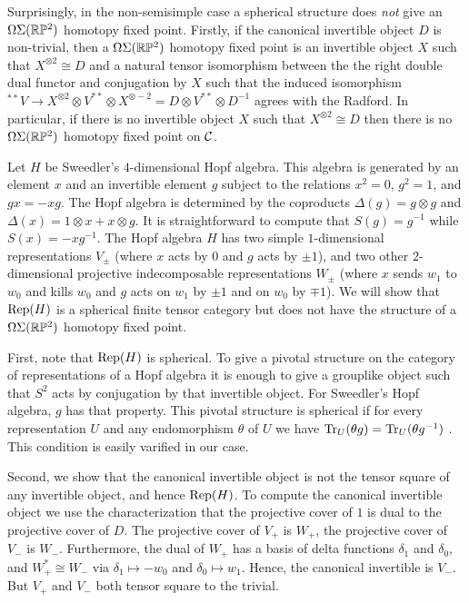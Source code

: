 \documentclass{amsart}
\begin{document}
Surprisingly, in the non-semisimple case a spherical structure does \emph{not} give an $\Omega \Sigma (\mathbb R \mathbb P^2)$ homotopy fixed point.  Firstly, if the canonical invertible object $D$ is non-trivial, then a $\Omega \Sigma (\mathbb R \mathbb P^2)$ homotopy fixed point is an invertible object $X$ such that $X^{\otimes 2} \cong D$ and a natural tensor isomorphism between the the right double dual functor and conjugation by $X$ such that the induced isomorphism ${}^{**}V \rightarrow X^{\otimes 2} \otimes V^{**} \otimes X^{\otimes -2} = D \otimes V^{**} \otimes D^{-1}$ agrees with the Radford.  In particular, if there is no invertible object $X$ such that $X^{\otimes 2} \cong D$ then there is no $\Omega \Sigma (\mathbb R \mathbb P^2)$ homotopy fixed point on $\mathcal C$.

\begin{example}
Let $H$ be Sweedler's $4$-dimensional Hopf algebra.  This algebra is generated by an element $x$ and an invertible element $g$ subject to the relations $x^2 = 0$, $g^2 = 1$, and $gx = -xg$.  The Hopf algebra is determined by the coproducts $\Delta(g) = g \otimes g$ and $\Delta(x) = 1 \otimes x + x \otimes g$.  It is straightforward to compute that $S(g) = g^{-1}$ while $S(x) = - x g^{-1}$.  The Hopf algebra $H$ has two simple $1$-dimensional representations $V_{\pm}$ (where $x$ acts by $0$ and $g$ acts by $\pm 1$), and two other $2$-dimensional projective indecomposable representations $W_\pm$ (where $x$ sends $w_1$ to $w_0$ and kills $w_0$ and $g$ acts on $w_1$ by $\pm 1$ and on $w_0$ by $\mp 1$).  We will show that $\mathrm{Rep}(H)$ is a spherical finite tensor category but does not have the structure of a $\Omega \Sigma (\mathbb R \mathbb P^2)$ homotopy fixed point.

First, note that $\mathrm{Rep}(H)$ is spherical.  To give a pivotal structure on the category of representations of a Hopf algebra it is enough to give a grouplike object such that $S^2$ acts by conjugation by that invertible object.  For Sweedler's Hopf algebra, $g$ has that property.  This pivotal structure is spherical if for every representation $U$ and any endomorphism $\theta$ of $U$ we have $\mathrm{Tr}_U(\theta g) = \mathrm{Tr}_U(\theta g^{-1})$ \cite{???}.  This condition is easily varified in our case.

Second, we show that the canonical invertible object is not the tensor square of any invertible object, and hence $\mathrm{Rep}(H)$.  To compute the canonical invertible object we use the characterization that the projective cover of $1$ is dual to the projective cover of $D$.  The projective cover of $V_+$ is $W_+$, the projective cover of $V_-$ is $W_-$.  Furthermore, the dual of $W_+$ has a basis of delta functions $\delta_1$ and $\delta_0$, and $W_+^* \cong W_-$ via $\delta_1 \mapsto -w_0$ and $\delta_0 \mapsto w_1$.  Hence, the canonical invertible is $V_-$.  But $V_+$ and $V_-$ both tensor square to the trivial.
\end{example}
\end{document}

